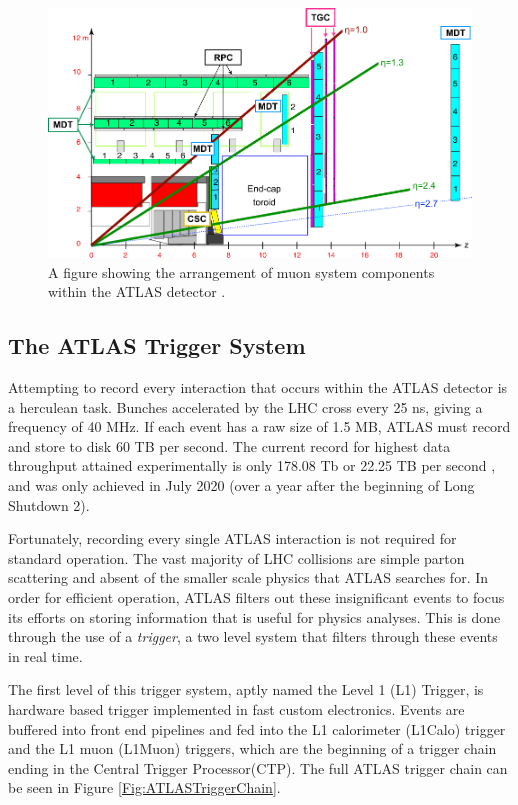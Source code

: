 \documentclass[12pt,a4paper,epsf,portrait,times,epsfig]{report}
\begin{document}
		\begin{figure}
			\centering
			\includegraphics[scale=1.5]{Muon_schematic_transp}
			\caption{A figure showing the arrangement of muon system components within the ATLAS detector \cite{ATLASTriggerImage}.}
			\label{Fig:MuonSystemLayout}
		\end{figure}


		\subsection{The ATLAS Trigger System}

		Attempting to record every interaction that occurs within the ATLAS detector is a herculean task. Bunches accelerated by the LHC cross every 25 ns, giving a frequency of 40 MHz. If each event has a raw size of 1.5 MB, ATLAS must record and store to disk 60 TB per second. The current record for highest data throughput attained experimentally is only 178.08 Tb or 22.25 TB per second \cite{UCLThroughput}, and was only achieved in July 2020 (over a year after the beginning of Long Shutdown 2). \par

		Fortunately, recording every single ATLAS interaction is not required for standard operation. The vast majority of LHC collisions are simple parton scattering and absent of the smaller scale physics that ATLAS searches for. In order for efficient operation, ATLAS filters out these insignificant events to focus its efforts on storing information that is useful for physics analyses. This is done through the use of a \textit{trigger}, a two level system that filters through these events in real time. \par

		The first level of this trigger system, aptly named the Level 1 (L1) Trigger, is hardware based trigger implemented in fast custom electronics. Events are buffered into front end pipelines and fed into the L1 calorimeter (L1Calo) trigger and the L1 muon (L1Muon) triggers, which are the beginning of a trigger chain ending in the Central Trigger Processor(CTP). The full ATLAS trigger chain can be seen in Figure \ref{Fig:ATLASTriggerChain}. \par
\end{document}
